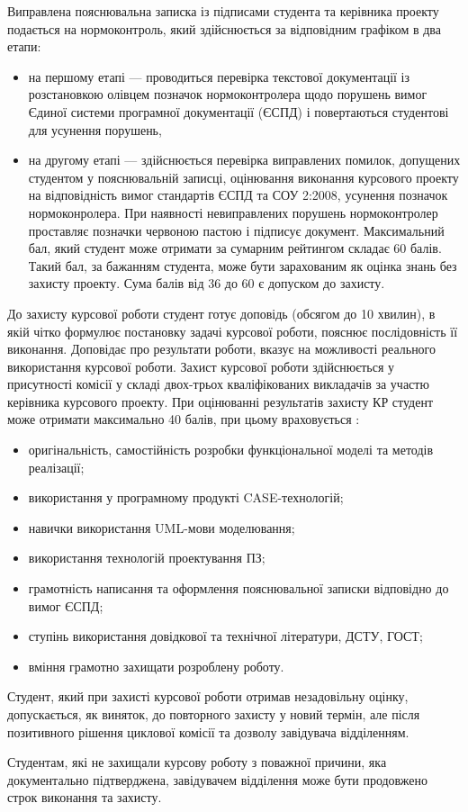 Виправлена пояснювальна записка із підписами студента та керівника проекту подається на нормоконтроль, який здійснюється  за відповідним графіком в два етапи:

\begin{itemize}
\item на першому етапі — проводиться перевірка текстової документації із розстановкою олівцем позначок нормоконтролера щодо порушень вимог Єдиної системи програмної документації (ЄСПД) і повертаються студентові для усунення порушень,
\item на другому етапі — здійснюється перевірка виправлених помилок, допущених студентом у пояснювальній записці, оцінювання виконання курсового проекту на відповідність вимог стандартів ЄСПД та СОУ 2:2008,  усунення позначок нормоконролера. При наявності невиправлених порушень нормоконтролер проставляє позначки червоною пастою і підписує документ.
Максимальний бал, який студент може отримати за сумарним рейтингом складає 60 балів. Такий бал, за бажанням студента, може бути зарахованим як оцінка знань без захисту проекту. Сума балів від 36 до 60 є допуском до захисту.
\end{itemize}

До захисту курсової роботи студент готує доповідь (обсягом до 10 хвилин), в якій чітко формулює постановку задачі курсової роботи, пояснює послідовність її виконання. Доповідає про результати роботи, вказує на можливості реального використання курсової роботи.
Захист курсової роботи здійснюється у присутності комісії у складі двох-трьох кваліфікованих викладачів за участю керівника курсового проекту.
При оцінюванні результатів захисту КР студент може отримати максимально 40 балів, при цьому враховується :
\begin{itemize}
\item оригінальність, самостійність розробки функціональної моделі та методів реалізації;
\item використання у програмному продукті CASE-технологій;
\item навички використання UML-мови моделювання;
\item використання технологій проектування ПЗ;
\item грамотність написання та оформлення пояснювальної записки відповідно до вимог ЄСПД;
\item ступінь використання довідкової та технічної літератури, ДСТУ, ГОСТ;
\item вміння грамотно захищати розроблену роботу.
\end{itemize}

Студент, який при захисті курсової роботи отримав незадовільну оцінку, допускається, як виняток, до повторного захисту у новий термін, але після позитивного рішення циклової комісії та дозволу завідувача відділенням.

Студентам, які не захищали курсову роботу з поважної причини, яка документально підтверджена, завідувачем відділення може бути продовжено строк виконання та захисту.
 
 

